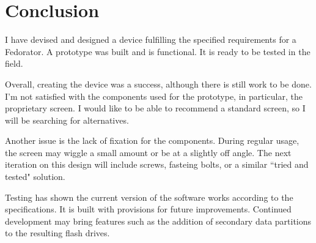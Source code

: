         
        \begin{comment}
        \todo{These are the final instructions that will be the "result" of the work.  Should they be inlined here?}
        \subsection{Bill of Materials}
            \todo{What is needed to get started - include a table and cost}
            \blind[3]
        \subsection{Step-by-step tutorial}
            \todo{The meat: how to build it from grounds up}
            \todo{Will not be present here, rather as an attachment.}
        \end{comment}
    \section{Conclusion}
        I have devised and designed a device fulfilling the specified requirements for a Fedorator.  A prototype was built and is functional.  It is ready to be tested in the field.
        
        Overall, creating the device was a success, although there is still work to be done.  I'm not satisfied with the components used for the prototype, in particular, the proprietary screen.  I would like to be able to recommend a standard screen, so I will be searching for alternatives.
        
        Another issue is the lack of fixation for the components.  During regular usage, the screen may wiggle a small amount or be at a slightly off angle.  The next iteration on this design will include screws, fasteing bolts, or a similar ``tried and tested" solution.
        
        Testing has shown the current version of the software works according to the specifications.  It is built with provisions for future improvements.  Continued development may bring features such as the addition of secondary data partitions to the resulting flash drives.
        
